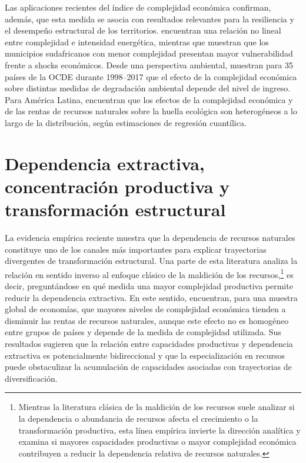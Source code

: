 \documentclass[../../TFM.tex]{subfiles}
\begin{document}
	Las aplicaciones recientes del índice de complejidad económica confirman, además, que esta medida se asocia con resultados relevantes para la resiliencia y el desempeño estructural de los territorios. \textcite{Kazemzadeh2023} encuentran una relación no lineal entre complejidad e intensidad energética, mientras que \textcite{Rossouw2023} muestran que los municipios sudafricanos con menor complejidad presentan mayor vulnerabilidad frente a shocks económicos. Desde una perspectiva ambiental, \textcite{Aluko2023} muestran para 35 países de la OCDE durante 1998--2017 que el efecto de la complejidad económica sobre distintas medidas de degradación ambiental depende del nivel de ingreso. Para América Latina, \textcite{Alvarado2021} encuentran que los efectos de la complejidad económica y de las rentas de recursos naturales sobre la huella ecológica son heterogéneos a lo largo de la distribución, según estimaciones de regresión cuantílica.

	\section{Dependencia extractiva, concentración productiva y transformación estructural}
	\label{sec:dependencia-concentracion-transformacion}
	
	La evidencia empírica reciente muestra que la dependencia de recursos naturales constituye uno de los canales más importantes para explicar trayectorias divergentes de transformación estructural. Una parte de esta literatura analiza la relación en sentido inverso al enfoque clásico de la maldición de los recursos,\footnote{Mientras la literatura clásica de la maldición de los recursos suele analizar si la dependencia o abundancia de recursos afecta el crecimiento o la transformación productiva, esta línea empírica invierte la dirección analítica y examina si mayores capacidades productivas o mayor complejidad económica contribuyen a reducir la dependencia relativa de recursos naturales.} es decir, preguntándose en qué medida una mayor complejidad productiva permite reducir la dependencia extractiva. En este sentido, \textcite{Canh2020} encuentran, para una muestra global de economías, que mayores niveles de complejidad económica tienden a disminuir las rentas de recursos naturales, aunque este efecto no es homogéneo entre grupos de países y depende de la medida de complejidad utilizada. Sus resultados sugieren que la relación entre capacidades productivas y dependencia extractiva es potencialmente bidireccional y que la especialización en recursos puede obstaculizar la acumulación de capacidades asociadas con trayectorias de diversificación.
\end{document}
